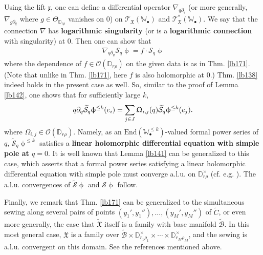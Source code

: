\documentclass[12pt,a4paper,notitlepage]{article}
\theoremstyle{definition}
\theoremstyle{plain}
\newcommand{\fk}{\mathfrak}
\newcommand{\mc}{\mathcal}
\newcommand{\wtd}{\widetilde}
\newcommand{\End}{\mathrm{End}} %
\newcommand{\scr}{\mathscr}
\newcommand{\xk}{\mathfrak x}
\newcommand{\blt}{\bullet}
\newcommand{\Wbb}{\mathbb W}
\newcommand{\Dbb}{\mathbb D}
\numberwithin{equation}{section}
\begin{document}
Using the lift $\xk$, one can define a differential operator $\nabla_{q\partial_q}$ (or more generally, $\nabla_{g\partial_q}$ where $g\in\Theta_{\Dbb_{r\rho}}$ vanishes on $0$) on $\scr T_{\fk X}(\Wbb_\blt)$ and $\scr T_{\fk X}^*(\Wbb_\blt)$. We say that the connection $\nabla$ has \textbf{logarithmic singularity} (or is a \textbf{logarithmic connection} with singularity) at $0$. Then one can show  that
\begin{align}
\nabla_{q\partial_q}\mc S_q\upphi=f\cdot\mc S_q\upphi
\end{align}
where the dependence of $f\in\scr O(\Dbb_{r\rho})$ on the given data is as in Thm. \ref{lb171}. (Note that unlike in Thm. \ref{lb171},  here $f$ is also holomorphic at $0$.) Thm. \ref{lb138} indeed holds in the present case as well. So, similar to the proof of Lemma \ref{lb142}, one shows that for sufficiently large $k$,
\begin{align}
q\partial_q\wtd{\mc S}_q\upphi^{\leq k}(e_i)=\sum_{j\in J}\Upomega_{i,j}(q)\wtd{\mc S}_q\upphi^{\leq k}(e_j).\label{eq253}
\end{align}
where $\Omega_{i,j}\in\scr O(\Dbb_{r\rho})$. Namely, as an $\End(\Wbb_\blt^{\leq k})$-valued formal power series of $q$, $\wtd{\mc S}_q\upphi^{\leq k}$ satisfies a \textbf{linear holomorphic differential equation with simple pole at $q=0$}. It is well known that Lemma \ref{lb141} can be generalized to this case, which asserts that a formal power series satisfying a linear holomorphic differential equation with simple pole must converge a.l.u. on $\Dbb_{r\rho}^\times$ (cf. e.g. \cite[Sec. 1.7]{Gui}). The a.l.u. convergences of $\wtd{\mc S}\upphi$ and $\mc S\upphi$ follow. 

Finally, we remark that Thm. \ref{lb171} can be generalized to the simultaneous sewing along several pairs of points $(y_1',y_1''),\dots,(y_M',y_M'')$ of $\wtd C$, or even more generally, the case that $\wtd {\fk X}$ itself is a family with base manifold $\wtd{\mc B}$. In this most general case, $\fk X$ is a family over $\wtd{\mc B}\times\Dbb^\times_{r_1\rho_1}\times\cdots\times\Dbb^\times_{r_M\rho_M}$, and the sewing is a.l.u. convergent on this domain. See the references mentioned above.




\subsection{}
\end{document}
